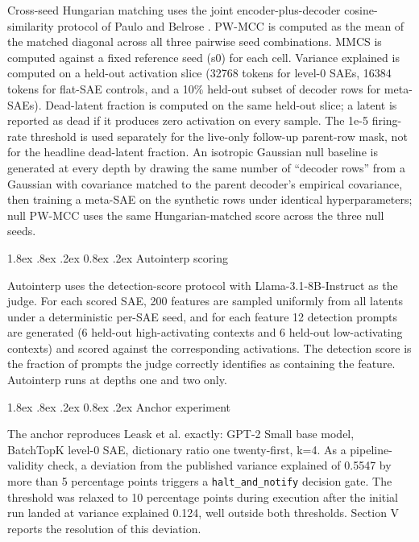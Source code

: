 \documentclass[conference]{IEEEtran}
\makeatletter
\renewcommand\subsection{\@startsection{subsection}{2}{\z@}%
   {1.8ex \@plus .8ex \@minus .2ex}%
   {0.8ex \@plus .2ex}%
   {\normalfont\large\bfseries}}
\makeatother
\begin{document}
Cross-seed Hungarian matching uses the joint encoder-plus-decoder
cosine-similarity protocol of Paulo and Belrose
\autocite{paulo2025sparse}. PW-MCC is computed as the mean of the
matched diagonal across all three pairwise seed combinations. MMCS is
computed against a fixed reference seed (s0) for each cell. Variance
explained is computed on a held-out activation slice (32768 tokens for
level-0 SAEs, 16384 tokens for flat-SAE controls, and a 10\% held-out
subset of decoder rows for meta-SAEs). Dead-latent fraction is computed
on the same held-out slice; a latent is reported as dead if it produces
zero activation on every sample. The 1e-5 firing-rate threshold is used
separately for the live-only follow-up parent-row mask, not for the
headline dead-latent fraction. An isotropic Gaussian null baseline is
generated at every depth by drawing the same number of ``decoder rows''
from a Gaussian with covariance matched to the parent decoder's
empirical covariance, then training a meta-SAE on the synthetic rows
under identical hyperparameters; null PW-MCC uses the same
Hungarian-matched score across the three null seeds.

\hypertarget{e.-autointerp-scoring}{%
\subsection{Autointerp scoring}\label{e.-autointerp-scoring}}

Autointerp uses the detection-score protocol
\autocite{paulo2024autointerp} with Llama-3.1-8B-Instruct
\autocite{dubey2024llama} as the judge. For each scored SAE, 200
features are sampled uniformly from all latents under a deterministic
per-SAE seed, and for each feature 12 detection prompts are generated (6
held-out high-activating contexts and 6 held-out low-activating
contexts) and scored against the corresponding activations. The
detection score is the fraction of prompts the judge correctly
identifies as containing the feature. Autointerp runs at depths one and
two only.

\hypertarget{f.-anchor-experiment}{%
\subsection{Anchor experiment}\label{f.-anchor-experiment}}

The anchor reproduces Leask et al. \autocite{leask2025sparse} exactly:
GPT-2 Small base model, BatchTopK level-0 SAE, dictionary ratio one
twenty-first, k=4. As a pipeline-validity check, a deviation from the
published variance explained of 0.5547 by more than 5 percentage points
triggers a \texttt{halt\_and\_notify} decision gate. The threshold was
relaxed to 10 percentage points during execution after the initial run
landed at variance explained 0.124, well outside both thresholds.
Section V reports the resolution of this deviation.
\end{document}
